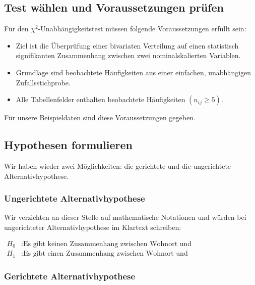 \documentclass[
  11pt,
  ngerman,
  a4paper,
]{report}
\providecommand{\tightlist}{%
  \setlength{\itemsep}{0pt}\setlength{\parskip}{0pt}}
\begin{document}
\hypertarget{test-wuxe4hlen-und-voraussetzungen-pruxfcfen-4}{%
\subsection{Test wählen und Voraussetzungen prüfen}\label{test-wuxe4hlen-und-voraussetzungen-pruxfcfen-4}}

Für den \(\chi^2\)-Unabhängigkeitstest müssen folgende Voraussetzungen erfüllt sein:

\begin{itemize}
\tightlist
\item
  Ziel ist die Überprüfung einer bivariaten Verteilung auf einen statistisch signifikanten Zusammenhang zwischen zwei nominalskalierten Variablen.
\item
  Grundlage sind beobachtete Häufigkeiten aus einer einfachen, unabhängigen Zufallsstichprobe.
\item
  Alle Tabellenfelder enthalten beobachtete Häufigkeiten \((n_{ij}\geq 5)\).
\end{itemize}

Für unsere Beispieldaten sind diese Voraussetzungen gegeben.

\hypertarget{hypothesen-formulieren-4}{%
\subsection{Hypothesen formulieren}\label{hypothesen-formulieren-4}}

Wir haben wieder zwei Möglichkeiten: die gerichtete und die ungerichtete Alternativhypothese.

\hypertarget{ungerichtete-alternativhypothese-2}{%
\subsubsection{Ungerichtete Alternativhypothese}\label{ungerichtete-alternativhypothese-2}}

Wir verzichten an dieser Stelle auf mathematische Notationen und würden bei ungerichteter Alternativhypothese im Klartext schreiben:

\[
\begin{aligned}
H_0 &: \textrm{Es gibt keinen Zusammenhang zwischen Wohnort und Verweigerungsentscheidung.}\\
H_1 &: \textrm{Es gibt einen Zusammenhang zwischen Wohnort und Verweigerungsentscheidung.}
\end{aligned}
\]

\hypertarget{gerichtete-alternativhypothese-2}{%
\subsubsection{Gerichtete Alternativhypothese}\label{gerichtete-alternativhypothese-2}}
\end{document}
